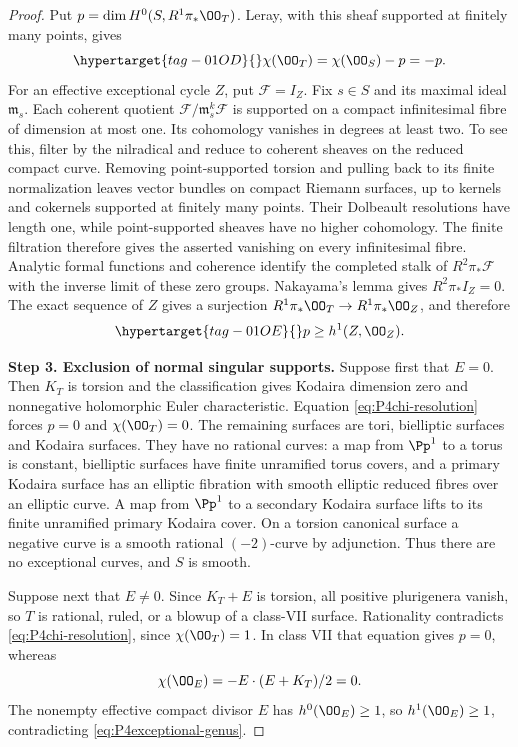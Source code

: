 \begin{proof}
Put $p=\dim H^0(S,R^1\pi_*\OO_T)$. Leray, with this sheaf
supported at finitely many points, gives
\begin{equation}\hypertarget{tag-01OD}{}\label{eq:P4chi-resolution}
 \chi(\OO_T)=\chi(\OO_S)-p=-p.
\end{equation}
For an effective exceptional cycle $Z$, put $\mathcal F=I_Z$.
Fix $s\in S$ and its maximal ideal $\mathfrak m_s$. Each coherent
quotient $\mathcal F/\mathfrak m_s^k\mathcal F$ is supported on a
compact infinitesimal fibre of dimension at most one. Its cohomology
vanishes in degrees at least two. To see this, filter by the nilradical
and reduce to coherent sheaves on the reduced compact curve. Removing
point-supported torsion and pulling back to its finite normalization
leaves vector bundles on compact Riemann surfaces, up to kernels and
cokernels supported at finitely many points. Their Dolbeault resolutions
have length one, while point-supported sheaves have no higher
cohomology. The finite filtration therefore gives the asserted vanishing
on every infinitesimal fibre.
Analytic formal functions and coherence
\cite[\S6, Haupts\"atze~I and~IIa, p.~59]{Grauert1960D} identify
the completed stalk of $R^2\pi_*\mathcal F$ with the inverse limit of
these zero groups. Nakayama's lemma gives $R^2\pi_*I_Z=0$.
The exact sequence of $Z$ gives a surjection
$R^1\pi_*\OO_T\to R^1\pi_*\OO_Z$, and therefore
\begin{equation}\hypertarget{tag-01OE}{}\label{eq:P4exceptional-genus}
 p\ge h^1(Z,\OO_Z).
\end{equation}

\noindent\textbf{Step 3. Exclusion of normal singular supports.}
Suppose first that $E=0$. Then $K_T$ is torsion and the
classification \cite[Chapter~VI, Theorem~1.1, p.~243]{BHPV2004E} gives Kodaira dimension zero and nonnegative
holomorphic Euler characteristic. Equation
\eqref{eq:P4chi-resolution} forces $p=0$ and $\chi(\OO_T)=0$.
The remaining surfaces are tori, bielliptic surfaces and Kodaira
surfaces. They have no rational curves: a map from $\Pp^1$ to
a torus is constant, bielliptic surfaces have finite unramified
torus covers, and a primary Kodaira surface has an elliptic
fibration with smooth elliptic reduced fibres over an elliptic
curve. A map from $\Pp^1$ to a secondary Kodaira surface lifts
to its finite unramified primary Kodaira cover. On a torsion
canonical surface a negative curve is a smooth rational
$(-2)$-curve by adjunction. Thus there are no exceptional
curves, and $S$ is smooth.

Suppose next that $E\ne0$. Since $K_T+E$ is torsion, all
positive plurigenera vanish, so $T$ is rational, ruled, or a
blowup of a class-VII surface. Rationality contradicts
\eqref{eq:P4chi-resolution}, since $\chi(\OO_T)=1$. In class
VII that equation gives $p=0$, whereas
\[
 \chi(\OO_E)=-E\cdot(E+K_T)/2=0.
\]
The nonempty effective compact divisor $E$ has $h^0(\OO_E)\ge1$,
so $h^1(\OO_E)\ge1$, contradicting
\eqref{eq:P4exceptional-genus}.


\end{proof}
